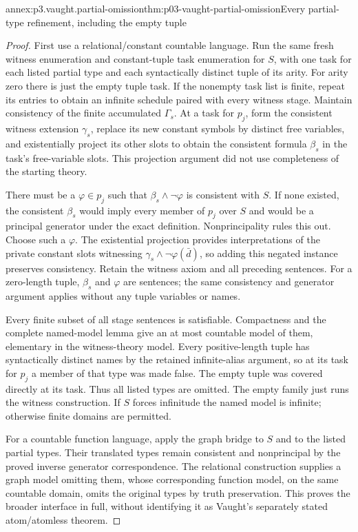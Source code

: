 \begin{annexitem}{annex:p3.vaught.partial-omission}{thm:p03-vaught-partial-omission}{Every partial-type refinement, including the empty tuple}
\begin{proof}
First use a relational/constant countable language.
Run the same fresh witness enumeration and constant-tuple
task enumeration for \(S\), with one task for each listed
partial type and each syntactically distinct tuple of its arity.
For arity zero there is just the empty tuple task.
If the nonempty task list is finite, repeat its entries to obtain
an infinite schedule paired with every witness stage.
Maintain consistency of the finite accumulated \(\Gamma_s\).
At a task for \(p_j\), form the consistent witness extension
\(\gamma_s\), replace its new constant symbols by distinct
free variables, and existentially project its other slots
to obtain the consistent formula \(\beta_s\) in the task's
free-variable slots. This projection argument did not use
completeness of the starting theory.

There must be a \(\varphi\in p_j\) such that
\(\beta_s\land\neg\varphi\) is consistent with \(S\).
If none existed, the consistent \(\beta_s\) would imply every
member of \(p_j\) over \(S\) and would be a principal generator
under the exact definition. Nonprincipality rules this out.
Choose such a \(\varphi\). The existential projection provides
interpretations of the private constant slots witnessing
\(\gamma_s\land\neg\varphi(\bar d)\), so adding this negated
instance preserves consistency.
Retain the witness axiom and all preceding sentences.
For a zero-length tuple, \(\beta_s\) and \(\varphi\) are sentences;
the same consistency and generator argument applies without
any tuple variables or names.

Every finite subset of all stage sentences is satisfiable.
Compactness and the complete named-model lemma give an at most
countable model of them, elementary in the witness-theory model.
Every positive-length tuple has syntactically distinct names
by the retained infinite-alias argument, so at its task for
\(p_j\) a member of that type was made false.
The empty tuple was covered directly at its task.
Thus all listed types are omitted. The empty family just runs
the witness construction. If \(S\) forces infinitude the named
model is infinite; otherwise finite domains are permitted.

For a countable function language, apply the graph bridge to
\(S\) and to the listed partial types.
Their translated types remain consistent and nonprincipal
by the proved inverse generator correspondence.
The relational construction supplies a graph model omitting
them, whose corresponding function model, on the same countable domain,
omits the original types by truth preservation.
This proves the broader interface in full, without identifying
it as Vaught's separately stated atom/atomless theorem.
\end{proof}
\end{annexitem}

